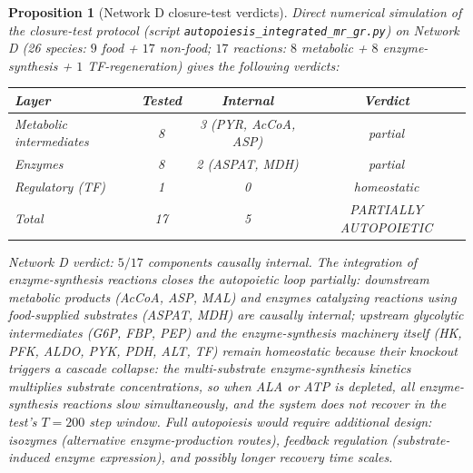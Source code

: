 \documentclass[11pt,a4paper]{article}
\theoremstyle{plain}
\newtheorem{proposition}[theorem]{Proposition}
\theoremstyle{definition}
\theoremstyle{remark}
\begin{document}
\begin{proposition}[Network D closure-test verdicts]
\label{prop:netD-verdict}
Direct numerical simulation of the closure-test protocol
(script \texttt{autopoiesis\_integrated\_mr\_gr.py}) on Network D
(26 species: $9$ food + $17$ non-food; $17$ reactions: $8$ metabolic +
$8$ enzyme-synthesis + $1$ TF-regeneration) gives the following verdicts:
\begin{center}\small
\begin{tabular}{lccc}
\toprule
Layer & Tested & Internal & Verdict \\
\midrule
Metabolic intermediates & 8 & 3 (PYR, AcCoA, ASP) & partial \\
Enzymes & 8 & 2 (ASPAT, MDH) & partial \\
Regulatory (TF) & 1 & 0 & homeostatic \\
\midrule
Total & 17 & 5 & PARTIALLY AUTOPOIETIC \\
\bottomrule
\end{tabular}
\end{center}
Network D verdict: $5/17$ components causally internal. The integration
of enzyme-synthesis reactions closes the autopoietic loop \emph{partially}:
downstream metabolic products (AcCoA, ASP, MAL) and enzymes catalyzing
reactions using food-supplied substrates (ASPAT, MDH) are causally
internal; upstream glycolytic intermediates (G6P, FBP, PEP) and the
enzyme-synthesis machinery itself (HK, PFK, ALDO, PYK, PDH, ALT, TF)
remain homeostatic because their knockout triggers a cascade collapse:
the multi-substrate enzyme-synthesis kinetics multiplies substrate
concentrations, so when ALA or ATP is depleted, all enzyme-synthesis
reactions slow simultaneously, and the system does not recover in the
test's $T = 200$ step window. Full autopoiesis would require additional
design: isozymes (alternative enzyme-production routes), feedback
regulation (substrate-induced enzyme expression), and possibly longer
recovery time scales.
\end{proposition}
\end{document}
